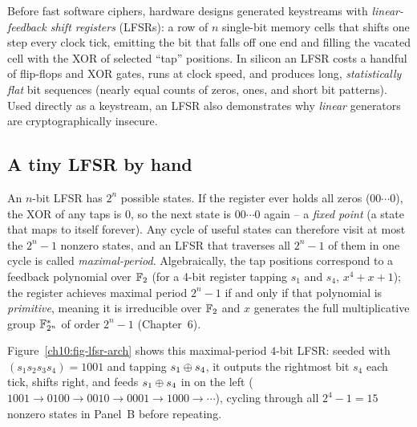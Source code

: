 Before fast software ciphers, hardware designs generated keystreams with \emph{linear-feedback shift registers} (LFSRs): a row of $n$ single-bit memory cells that shifts one step every clock tick, emitting the bit that falls off one end and filling the vacated cell with the XOR of selected ``tap'' positions. In silicon an LFSR costs a handful of flip-flops and XOR gates, runs at clock speed, and produces long, \emph{statistically flat} bit sequences (nearly equal counts of zeros, ones, and short bit patterns). Used directly as a keystream, an LFSR also demonstrates why \emph{linear} generators are cryptographically insecure.

\subsection{A tiny LFSR by hand}
\label{ch10:lfsr-example}

An $n$-bit LFSR has $2^n$ possible states. If the register ever holds all zeros ($00\cdots 0$), the XOR of any taps is $0$, so the next state is $00\cdots 0$ again -- a \emph{fixed point} (a state that maps to itself forever). Any cycle of useful states can therefore visit at most the $2^n - 1$ nonzero states, and an LFSR that traverses all $2^n - 1$ of them in one cycle is called \emph{maximal-period}. Algebraically, the tap positions correspond to a feedback polynomial over $\mathbb{F}_2$ (for a 4-bit register tapping $s_1$ and $s_4$, $x^4 + x + 1$); the register achieves maximal period $2^n - 1$ if and only if that polynomial is \emph{primitive}, meaning it is irreducible over $\mathbb{F}_2$ and $x$ generates the full multiplicative group $\mathbb{F}_{2^n}^*$ of order $2^n - 1$ (Chapter~6).

Figure~\ref{ch10:fig-lfsr-arch} shows this maximal-period $4$-bit LFSR: seeded with $(s_1 s_2 s_3 s_4) = 1001$ and tapping $s_1 \oplus s_4$, it outputs the rightmost bit $s_4$ each tick, shifts right, and feeds $s_1 \oplus s_4$ in on the left ($1001 \to 0100 \to 0010 \to 0001 \to 1000 \to \cdots$), cycling through all $2^4 - 1 = 15$ nonzero states in Panel~B before repeating.

